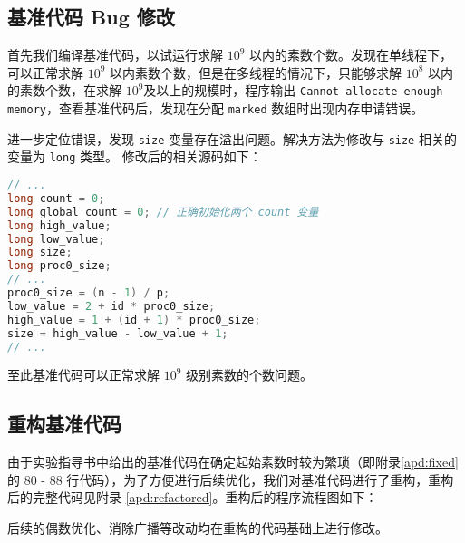 \documentclass[11pt]{article}
\begin{document}
  \subsection{基准代码 Bug 修改}
  首先我们编译基准代码，以试运行求解 $10^9$ 以内的素数个数。发现在单线程下，可以正常求解 $10^9$ 以内素数个数，但是在多线程的情况下，只能够求解 $10^8$ 以内的素数个数，在求解 $10^9$及以上的规模时，程序输出 \lstinline{Cannot allocate enough memory}，查看基准代码后，发现在分配 \verb|marked| 数组时出现内存申请错误。

  进一步定位错误，发现 \verb|size| 变量存在溢出问题。解决方法为修改与 \verb|size| 相关的变量为 \verb|long| 类型。 修改后的相关源码如下：
  \begin{file}
    \begin{lstlisting}[language=C++]
// ...
long count = 0;
long global_count = 0; // 正确初始化两个 count 变量
long high_value; 
long low_value;
long size;
long proc0_size;
// ...
proc0_size = (n - 1) / p;
low_value = 2 + id * proc0_size;
high_value = 1 + (id + 1) * proc0_size;
size = high_value - low_value + 1;
// ...
    \end{lstlisting}
  \end{file}

  至此基准代码可以正常求解 $10^9$ 级别素数的个数问题。

  \subsection{重构基准代码}
  由于实验指导书中给出的基准代码在确定起始素数时较为繁琐（即附录\ref{apd:fixed} 的 80 - 88 行代码），为了方便进行后续优化，我们对基准代码进行了重构，重构后的完整代码见附录 \ref{apd:refactored}。重构后的程序流程图如下：

  \begin{figure}[h]
    \centering
  \end{figure}
  后续的偶数优化、消除广播等改动均在重构的代码基础上进行修改。
\end{document}

